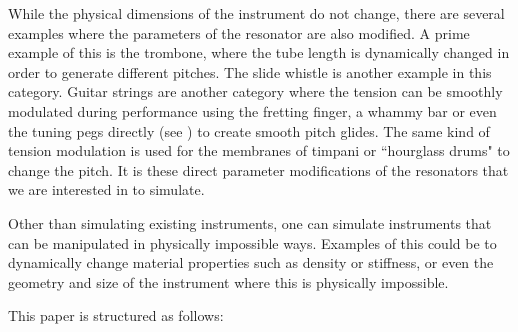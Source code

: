 While the physical dimensions of the instrument do not change, there are several examples where the parameters of the resonator are also modified. A prime example of this is the trombone, where the tube length is dynamically changed in order to generate different pitches. The slide whistle is another example in this category. Guitar strings are another category where the tension can be smoothly modulated during performance using the fretting finger, a whammy bar or even the tuning pegs directly (see \cite{Gomm2011}) to create smooth pitch glides. The same kind of tension modulation is used for the membranes of timpani or ``hourglass drums" to change the pitch. %
It is these direct parameter modifications of the resonators that we are interested in to simulate.



Other than simulating existing instruments, one can simulate instruments that can be manipulated in physically impossible ways. %
Examples of this could be to dynamically change material properties such as density or stiffness, or even the geometry and size of the instrument where this is physically impossible. %


 

 This paper is structured as follows:
